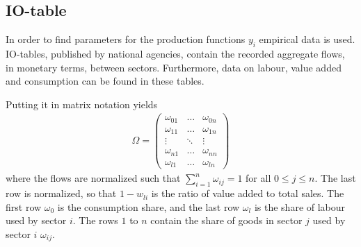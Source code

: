 \documentclass{article}
\begin{document}
\subsection{IO-table}

In order to find parameters for the production functions $y_i$ empirical data is used. 
IO-tables, published by national agencies, contain the recorded aggregate flows, in monetary terms, between sectors.
Furthermore, data on labour, value added and consumption can be found in these tables. 

Putting it in matrix notation yields
\begin{align}
  \Omega = \begin{pmatrix}
    \omega_{01} &\dots &\omega_{0n} \\ 
    \omega_{11} & \dots &\omega_{1n} \\ 
    \vdots &\ddots &\vdots \\ 
    \omega_{n1} & \dots & \omega_{nn} \\ 
    \omega_{l1} & \dots & \omega_{ln}
  \end{pmatrix}
\end{align}
where the flows are normalized such that $\sum_{i=1}^n \omega_{ij} = 1$ for all $0 \leq j \leq n$. The last row is normalized, so that $1- w_{li}$ is the ratio of value added to total sales.  The first row $\omega_{0}$ is the consumption share, and the last row $\omega_l$ is the share of labour used by sector $i$. 
The rows $1$ to $n$ contain the share of goods in sector $j$ used by sector $i$ $\omega_{ij}$. 
\end{document}
